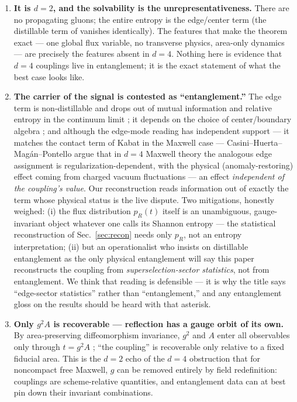 \documentclass[11pt]{article}
\theoremstyle{remark}
\theoremstyle{plain}
\begin{document}
\begin{enumerate}

\item \textbf{It is $d = 2$, and the solvability is the unrepresentativeness.} There are no propagating gluons; the entire entropy is the edge/center term (the distillable term of \cite{D11} vanishes identically). The features that make the theorem exact --- one global flux variable, no transverse physics, area-only dynamics --- are precisely the features absent in $d = 4$. Nothing here is evidence that $d = 4$ couplings live in entanglement; it is the exact statement of what the best case looks like.

\item \textbf{The carrier of the signal is contested as ``entanglement.''} The edge term is non-distillable and drops out of mutual information and relative entropy in the continuum limit \cite{ST16, MST18}; it depends on the choice of center/boundary algebra \cite{CHR}; and although the edge-mode reading has independent support --- it matches the contact term of Kabat \cite{K95} in the Maxwell case \cite{DW14, DW16} --- Casini--Huerta--Mag\'an--Pontello \cite{CHMP} argue that in $d = 4$ Maxwell theory the analogous edge assignment is regularization-dependent, with the physical (anomaly-restoring) effect coming from charged vacuum fluctuations --- an effect \emph{independent of the coupling's value}. Our reconstruction reads information out of exactly the term whose physical status is the live dispute. Two mitigations, honestly weighed: (i) the flux distribution $p_R(t)$ itself is an unambiguous, gauge-invariant object whatever one calls its Shannon entropy --- the statistical reconstruction of Sec.~\ref{sec:recon} needs only $p_R$, not an entropy interpretation; (ii) but an operationalist who insists on distillable entanglement as the only physical entanglement will say this paper reconstructs the coupling from \emph{superselection-sector statistics}, not from entanglement. We think that reading is defensible --- it is why the title says ``edge-sector statistics'' rather than ``entanglement,'' and any entanglement gloss on the results should be heard with that asterisk.

\item \textbf{Only $g^2 A$ is recoverable --- reflection has a gauge orbit of its own.} By area-preserving diffeomorphism invariance, $g^2$ and $A$ enter all observables only through $t = g^2 A$ \cite{GS14}; ``the coupling'' is recoverable only relative to a fixed fiducial area. This is the $d = 2$ echo of the $d = 4$ obstruction that for noncompact free Maxwell, $g$ can be removed entirely by field redefinition: couplings are scheme-relative quantities, and entanglement data can at best pin down their invariant combinations.


\end{enumerate}
\end{document}
